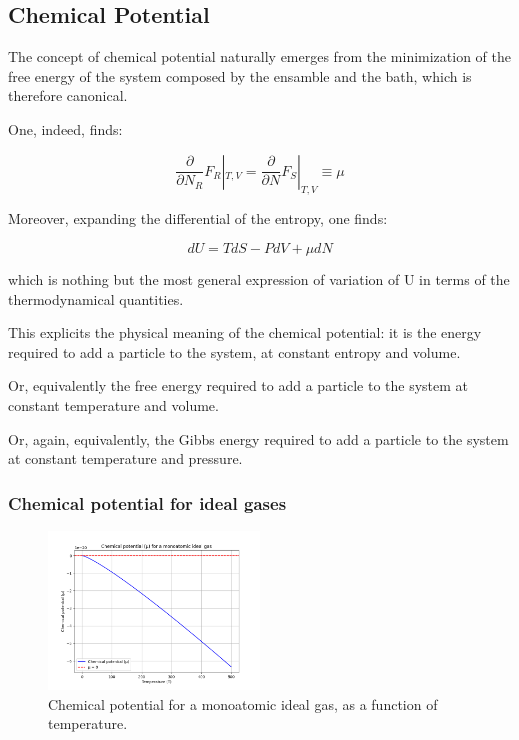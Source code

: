 \documentclass{article}
\begin{document}
\subsection{Chemical Potential}

The concept of chemical potential naturally emerges from the minimization of the free energy
of the system composed by the ensamble and the bath, which is therefore canonical.

One, indeed, finds:

\begin{tcolorbox}[colframe=gray!50, colback=gray!10, coltitle=black, title=Chemical Potential]
    \begin{equation}
        \frac{\partial}{\partial N_R}F_R|_{T,V}=\frac{\partial}{\partial N}F_S|_{T,V}\equiv \mu
    \end{equation}
\end{tcolorbox}


Moreover, expanding the differential of the entropy, one finds:

\begin{equation}
    dU=TdS-PdV+\mu dN
\end{equation}

which is nothing but the most general expression of variation of U in terms of the thermodynamical quantities.

This explicits the physical meaning of the chemical potential: it is the energy required to add a particle to the system,
at constant entropy and volume.

Or, equivalently the free energy required to add a particle to the system at constant temperature and volume.

Or, again, equivalently, the Gibbs energy required to add a particle to the system at constant temperature and pressure.

\subsubsection{Chemical potential for ideal gases}

\begin{figure}[h!]
    \centering
    \includegraphics[width=0.5\textwidth]{images/mu-monoatomic-ideal-gas.png}
    \caption{Chemical potential for a monoatomic ideal gas, as a function of temperature.}
    \label{fig:chemical-potential}
\end{figure}
\end{document}

